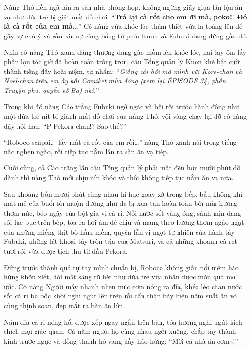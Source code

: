 \documentclass[../main.tex]{subfiles}
\begin{document}
Nàng Thỏ liền ngã lăn ra sàn nhà phòng họp, không ngừng giãy giụa lăn lộn ăn vạ như đứa trẻ bị giật mất đồ chơi: ``\textbf{Trả lại cà rốt cho em đi mà, peko!! Đó là cà rốt của em mà\dots}'' Cô nàng vừa khóc lóc thảm thiết vừa la toáng lên để gây sự chú ý và cầu xin sự công bằng từ phía Kuon và Fubuki đang đứng gần đó.

Nhìn cô nàng Thỏ xanh đáng thương đang gào mồm lên khóc lóc, hai tay ôm lấy phần lọn tóc giờ đã hoàn toàn trống trơn, cậu Tổng quản lý Kuon khẽ bật cười thành tiếng đầy hoài niệm, tự nhẩm: ``\textit{Giống cái hồi mà mình với Koro-chan và Noel-chan trêu em ấy hồi Comiket mùa đông (xem lại ÉPISODE 34, phần Truyện phụ, quyển số Ba) nhỉ.}''

Trong khi đó nàng Cáo trắng Fubuki ngỡ ngác và bối rối trước hành động như một đứa trẻ nít bị giành mất đồ chơi của nàng Thỏ, vội vàng chạy lại đỡ cô nàng dậy hỏi han: ``P-Pekora-chan!? Sao thế?''

``Roboco-senpai\dots\ lấy mất cà rốt của em rồi\dots'' nàng Thỏ xanh nói trong tiếng nấc nghẹn ngào, rồi tiếp tục nằm lăn ra sàn ăn vạ tiếp.

Cuối cùng, cả Cáo trắng lẫn cậu Tổng quản lý phải mất đến hơn mười phút dỗ dành thì nàng Thỏ mới chịu nín khóc và thôi không tiếp tục nằm ăn vạ nữa.

\ct

Sau khoảng bốn mươi phút cùng nhau hì hục xoay xở trong bếp, bầu không khí mát mẻ của buổi tối muộn dường như đã bị xua tan hoàn toàn bởi mùi hương thơm nức, béo ngậy của bột gia vị cà ri. Nồi nước sốt vàng óng, sánh mịn đang sôi lục bục trên bếp, tỏa ra hơi ấm dễ chịu và mang theo hương thơm ngào ngạt của những miếng thịt bò hầm mềm, quyện lẫn vị ngọt tự nhiên của hành tây Fubuki, những lát khoai tây tròn trịa của Matsuri, và cả những khoanh cà rốt tươi rói vừa được tịch thu từ đầu Pekora.

Đứng trước thành quả tự tay mình chuẩn bị, Roboco không giấu nổi niềm hào hứng khôn xiết, đôi mắt sáng rỡ hệt như đứa trẻ vừa nhận được món quà mơ ước. Cô nàng Người máy nhanh nhẹn múc cơm nóng ra đĩa, khéo léo chan nước sốt cà ri bò bốc khói nghi ngút lên trên rồi cẩn thận bày biện năm suất ăn vô cùng thịnh soạn, đẹp mắt ra bàn ăn lớn.


Năm đĩa cà ri nóng hổi được xếp ngay ngắn trên bàn, tỏa hương nghi ngút kích thích mọi giác quan. Cả năm người họ cùng nhau ngồi xuống, chắp tay thành kính trước ngực và đồng thanh hô vang đầy hào hứng: ``Mời cả nhà ăn cơm\~{}!''
\end{document}
